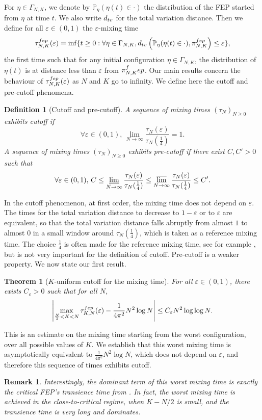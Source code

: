 \documentclass[11pt,a4paper]{article}
\renewcommand{\P}{\mathbb{P}}
\newcommand{\FEP}{\textsc{fep}}
\newtheorem{theorem}{Theorem}[section]
\newtheorem{definition}{Definition}[section]
\newtheorem{remark}{Remark}[section]
\newcommand{\eqs}[1]{\begin{equation}#1\end{equation}}
\newcommand{\eq}[2]{\begin{equation}\label{#1}#2\end{equation}}
\begin{document}
For $\eta \in \Gamma_{N,K}$, we denote by $\P_\eta(\eta(t) \in \cdot)$ the distribution of the FEP started from $\eta$ at time $t$. We also write $d_{\textsc{tv}}$ for the total variation distance. Then we define for all $\varepsilon \in (0,1)$ the $\varepsilon$-mixing time 
\eq{eq:deftmix}{\tau^{\FEP}_{N,K}(\varepsilon) = \inf \{t \ge 0 : \forall \eta \in \Gamma_{N,K}, d_{\textsc{tv}}\left(\P_\eta(\eta(t) \in \cdot), \pi_{N,K}^{\FEP}\right) \le \varepsilon \}, }
the first time such that for any initial configuration $\eta\in\Gamma_{N,K}$, the distribution of $\eta(t)$ is at distance less than $\varepsilon$ from $\pi_{N,K}^\FEP$. 
Our main results concern the behaviour of $\tau^{\FEP}_{N,K}(\varepsilon)$ as $N$ and $K$ go to infinity. We define here the cutoff and pre-cutoff phenomena.
\begin{definition}[Cutoff and pre-cutoff] A sequence of mixing times $(\tau_N)_{N\ge 0}$ exhibits \emph{cutoff} if
\eqs{\forall \varepsilon \in (0,1), \, \lim\limits_{N\to \infty} \frac{\tau_N(\varepsilon)}{\tau_N(\frac{1}{4})} = 1.}
A sequence of mixing times $(\tau_N)_{N\ge 0}$ exhibits \emph{pre-cutoff} if there exist $C, C' >0$ such that
\eqs{\forall \varepsilon \in (0,1), \, C \le \varliminf\limits_{N\to \infty} \frac{\tau_N(\varepsilon)}{\tau_N(\frac{1}{4})}\le \varlimsup\limits_{N\to \infty} \frac{\tau_N(\varepsilon)}{\tau_N(\frac{1}{4})} \le C'.}
\end{definition}
In the cutoff phenomenon, at first order, the mixing time does not depend on $\varepsilon$. The times for the total variation distance to decrease to $1-\varepsilon$ or to $\varepsilon$ are equivalent, so that the total variation distance falls abruptly from almost $1$ to almost $0$ in a small window around $\tau_N(\frac{1}{4})$, which is taken as a reference mixing time. The choice $\frac{1}{4}$ is often made for the reference mixing time, see for example \cite[Section 4.5]{levin_markov_2017}, but is not very important for the definition of cutoff. Pre-cutoff is a weaker property. We now state our first result.
\begin{theorem}[$K$-uniform cutoff for the mixing time]\label{theo1}
For all $\varepsilon \in (0,1)$, there exists $C_\varepsilon >0$ such that for all $N$, 
\eqs{\left|\max\limits_{\frac{N}{2}< K < N} \tau^{\FEP}_{K,N}(\varepsilon) - \frac{1}{4\pi^2}N^2 \log N\right| \le C_\varepsilon N^2\log\log N.}
\end{theorem}
This is an estimate on the mixing time starting from the worst configuration, over all possible values of $K$. We establish that this worst mixing time is asymptotically equivalent to $\frac{1}{4\pi^2}N^2 \log N$, which does not depend on $\varepsilon$, and therefore this sequence of times exhibits cutoff.
\begin{remark}Interestingly, the dominant term of this worst mixing time is exactly the critical FEP's transience time from \cite{erignoux_cutoff_2024}. In fact, the worst mixing time is achieved in the close-to-critical regime, when $K-N/2$ is small, and the transience time is very long and dominates.
\end{remark}
\end{document}
